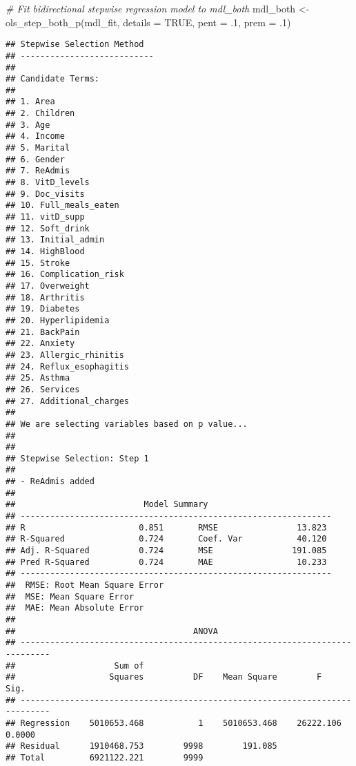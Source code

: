 \documentclass[
]{article}
\newenvironment{Shaded}{\begin{snugshade}}{\end{snugshade}}
\newcommand{\AttributeTok}[1]{\textcolor[rgb]{0.77,0.63,0.00}{#1}}
\newcommand{\CommentTok}[1]{\textcolor[rgb]{0.56,0.35,0.01}{\textit{#1}}}
\newcommand{\ConstantTok}[1]{\textcolor[rgb]{0.00,0.00,0.00}{#1}}
\newcommand{\DecValTok}[1]{\textcolor[rgb]{0.00,0.00,0.81}{#1}}
\newcommand{\FunctionTok}[1]{\textcolor[rgb]{0.00,0.00,0.00}{#1}}
\newcommand{\NormalTok}[1]{#1}
\newcommand{\OtherTok}[1]{\textcolor[rgb]{0.56,0.35,0.01}{#1}}
\begin{document}
\begin{Shaded}
\begin{Highlighting}[]
\CommentTok{\# Fit bidirectional stepwise regression model to mdl\_both }
\NormalTok{mdl\_both }\OtherTok{\textless{}{-}} \FunctionTok{ols\_step\_both\_p}\NormalTok{(mdl\_fit, }\AttributeTok{details =} \ConstantTok{TRUE}\NormalTok{, }\AttributeTok{pent =}\NormalTok{ .}\DecValTok{1}\NormalTok{, }\AttributeTok{prem =}\NormalTok{ .}\DecValTok{1}\NormalTok{)}
\end{Highlighting}
\end{Shaded}

\begin{verbatim}
## Stepwise Selection Method   
## ---------------------------
## 
## Candidate Terms: 
## 
## 1. Area 
## 2. Children 
## 3. Age 
## 4. Income 
## 5. Marital 
## 6. Gender 
## 7. ReAdmis 
## 8. VitD_levels 
## 9. Doc_visits 
## 10. Full_meals_eaten 
## 11. vitD_supp 
## 12. Soft_drink 
## 13. Initial_admin 
## 14. HighBlood 
## 15. Stroke 
## 16. Complication_risk 
## 17. Overweight 
## 18. Arthritis 
## 19. Diabetes 
## 20. Hyperlipidemia 
## 21. BackPain 
## 22. Anxiety 
## 23. Allergic_rhinitis 
## 24. Reflux_esophagitis 
## 25. Asthma 
## 26. Services 
## 27. Additional_charges 
## 
## We are selecting variables based on p value...
## 
## 
## Stepwise Selection: Step 1 
## 
## - ReAdmis added 
## 
##                          Model Summary                          
## ---------------------------------------------------------------
## R                       0.851       RMSE                13.823 
## R-Squared               0.724       Coef. Var           40.120 
## Adj. R-Squared          0.724       MSE                191.085 
## Pred R-Squared          0.724       MAE                 10.233 
## ---------------------------------------------------------------
##  RMSE: Root Mean Square Error 
##  MSE: Mean Square Error 
##  MAE: Mean Absolute Error 
## 
##                                    ANOVA                                     
## ----------------------------------------------------------------------------
##                    Sum of                                                   
##                   Squares          DF    Mean Square        F          Sig. 
## ----------------------------------------------------------------------------
## Regression    5010653.468           1    5010653.468    26222.106    0.0000 
## Residual      1910468.753        9998        191.085                        
## Total         6921122.221        9999                                       

\end{verbatim}
\end{document}
